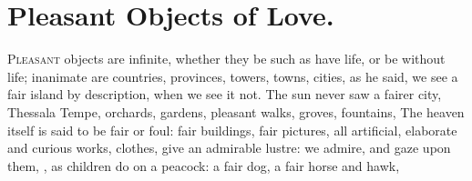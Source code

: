 {%
\section{Pleasant Objects of Love.}

\lettrine{P}{leasant} objects are infinite, whether they be such as have life, or be
without life; inanimate are countries, provinces, towers, towns,
cities, as he said,  we see a fair island by description, when we see it not. The
sun never saw a fairer city, Thessala Tempe, orchards, gardens,
pleasant walks, groves, fountains, \etc{} The heaven itself is said to be
fair or foul: fair buildings, fair pictures, all
artificial, elaborate and curious works, clothes, give an admirable
lustre: we admire, and gaze upon them, , as
children do on a peacock: a fair dog, a fair horse and hawk, \etc{}

}
